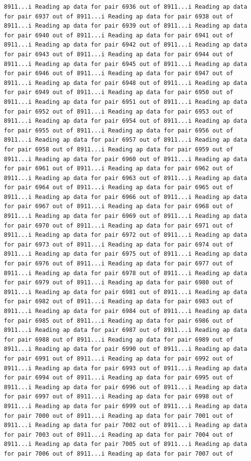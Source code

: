 \documentclass[
]{article}
\begin{document}
\begin{verbatim}
8911...i Reading ap data for pair 6936 out of 8911...i Reading ap data for pair 6937 out of 8911...i Reading ap data for pair 6938 out of 8911...i Reading ap data for pair 6939 out of 8911...i Reading ap data for pair 6940 out of 8911...i Reading ap data for pair 6941 out of 8911...i Reading ap data for pair 6942 out of 8911...i Reading ap data for pair 6943 out of 8911...i Reading ap data for pair 6944 out of 8911...i Reading ap data for pair 6945 out of 8911...i Reading ap data for pair 6946 out of 8911...i Reading ap data for pair 6947 out of 8911...i Reading ap data for pair 6948 out of 8911...i Reading ap data for pair 6949 out of 8911...i Reading ap data for pair 6950 out of 8911...i Reading ap data for pair 6951 out of 8911...i Reading ap data for pair 6952 out of 8911...i Reading ap data for pair 6953 out of 8911...i Reading ap data for pair 6954 out of 8911...i Reading ap data for pair 6955 out of 8911...i Reading ap data for pair 6956 out of 8911...i Reading ap data for pair 6957 out of 8911...i Reading ap data for pair 6958 out of 8911...i Reading ap data for pair 6959 out of 8911...i Reading ap data for pair 6960 out of 8911...i Reading ap data for pair 6961 out of 8911...i Reading ap data for pair 6962 out of 8911...i Reading ap data for pair 6963 out of 8911...i Reading ap data for pair 6964 out of 8911...i Reading ap data for pair 6965 out of 8911...i Reading ap data for pair 6966 out of 8911...i Reading ap data for pair 6967 out of 8911...i Reading ap data for pair 6968 out of 8911...i Reading ap data for pair 6969 out of 8911...i Reading ap data for pair 6970 out of 8911...i Reading ap data for pair 6971 out of 8911...i Reading ap data for pair 6972 out of 8911...i Reading ap data for pair 6973 out of 8911...i Reading ap data for pair 6974 out of 8911...i Reading ap data for pair 6975 out of 8911...i Reading ap data for pair 6976 out of 8911...i Reading ap data for pair 6977 out of 8911...i Reading ap data for pair 6978 out of 8911...i Reading ap data for pair 6979 out of 8911...i Reading ap data for pair 6980 out of 8911...i Reading ap data for pair 6981 out of 8911...i Reading ap data for pair 6982 out of 8911...i Reading ap data for pair 6983 out of 8911...i Reading ap data for pair 6984 out of 8911...i Reading ap data for pair 6985 out of 8911...i Reading ap data for pair 6986 out of 8911...i Reading ap data for pair 6987 out of 8911...i Reading ap data for pair 6988 out of 8911...i Reading ap data for pair 6989 out of 8911...i Reading ap data for pair 6990 out of 8911...i Reading ap data for pair 6991 out of 8911...i Reading ap data for pair 6992 out of 8911...i Reading ap data for pair 6993 out of 8911...i Reading ap data for pair 6994 out of 8911...i Reading ap data for pair 6995 out of 8911...i Reading ap data for pair 6996 out of 8911...i Reading ap data for pair 6997 out of 8911...i Reading ap data for pair 6998 out of 8911...i Reading ap data for pair 6999 out of 8911...i Reading ap data for pair 7000 out of 8911...i Reading ap data for pair 7001 out of 8911...i Reading ap data for pair 7002 out of 8911...i Reading ap data for pair 7003 out of 8911...i Reading ap data for pair 7004 out of 8911...i Reading ap data for pair 7005 out of 8911...i Reading ap data for pair 7006 out of 8911...i Reading ap data for pair 7007 out of 
\end{verbatim}
\end{document}
